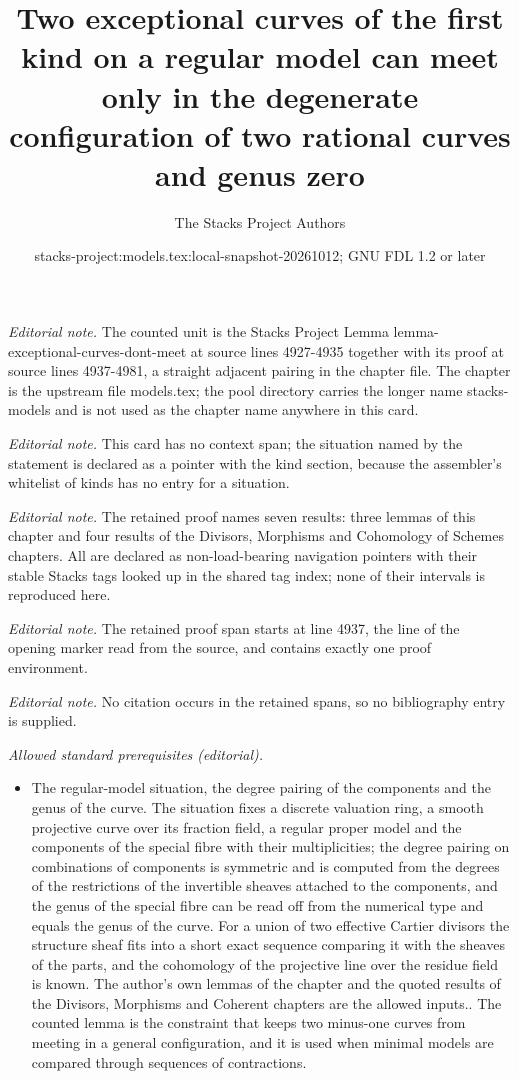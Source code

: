 \documentclass[10pt,a4paper]{amsart}
\title{Two exceptional curves of the first kind on a regular model can meet only in the degenerate configuration of two rational curves and genus zero}
\author{The Stacks Project Authors}
\date{stacks-project:models.tex:local-snapshot-20261012; GNU FDL 1.2 or later}
\theoremstyle{plain}
\theoremstyle{definition}
\theoremstyle{remark}
\numberwithin{equation}{subsection}
\begin{document}
\maketitle
\noindent\textit{Editorial note.} The counted unit is the Stacks Project Lemma lemma-exceptional-curves-dont-meet at source lines 4927-4935 together with its proof at source lines 4937-4981, a straight adjacent pairing in the chapter file. The chapter is the upstream file models.tex; the pool directory carries the longer name stacks-models and is not used as the chapter name anywhere in this card.\par\medskip
\noindent\textit{Editorial note.} This card has no context span; the situation named by the statement is declared as a pointer with the kind section, because the assembler's whitelist of kinds has no entry for a situation.\par\medskip
\noindent\textit{Editorial note.} The retained proof names seven results: three lemmas of this chapter and four results of the Divisors, Morphisms and Cohomology of Schemes chapters. All are declared as non-load-bearing navigation pointers with their stable Stacks tags looked up in the shared tag index; none of their intervals is reproduced here.\par\medskip
\noindent\textit{Editorial note.} The retained proof span starts at line 4937, the line of the opening marker read from the source, and contains exactly one proof environment.\par\medskip
\noindent\textit{Editorial note.} No citation occurs in the retained spans, so no bibliography entry is supplied.\par\medskip
\noindent\textit{Allowed standard prerequisites (editorial).}\begin{itemize}
\item The regular-model situation, the degree pairing of the components and the genus of the curve. The situation fixes a discrete valuation ring, a smooth projective curve over its fraction field, a regular proper model and the components of the special fibre with their multiplicities; the degree pairing on combinations of components is symmetric and is computed from the degrees of the restrictions of the invertible sheaves attached to the components, and the genus of the special fibre can be read off from the numerical type and equals the genus of the curve. For a union of two effective Cartier divisors the structure sheaf fits into a short exact sequence comparing it with the sheaves of the parts, and the cohomology of the projective line over the residue field is known. The author's own lemmas of the chapter and the quoted results of the Divisors, Morphisms and Coherent chapters are the allowed inputs.. The counted lemma is the constraint that keeps two minus-one curves from meeting in a general configuration, and it is used when minimal models are compared through sequences of contractions.
\end{itemize}\medskip
\end{document}
